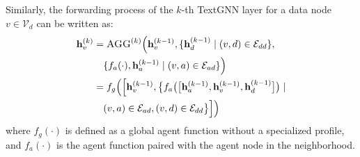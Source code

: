 Similarly, the forwarding process of the $k$-th TextGNN layer for a data node $v\in \mathcal{V}_d$ can be written as:
\begingroup
\small
\begin{equation}
\begin{aligned}
    \mathbf{h}_{v}^{(k)} & = \textsc{AGG}^{(k)}\Big( \mathbf{h}_v^{(k-1)}, \{\mathbf{h}_d^{(k-1)} \mid (v,d) \in \mathcal{E}_{dd}\}, \\
    &\quad \{f_a(\cdot), \mathbf{h}_a^{(k-1)} \mid (v,a) \in \mathcal{E}_{ad}\}\Big) \\
    &= f_g\Big(\Big[\mathbf{h}_v^{(k-1)}, \big\{f_a\big(\big[\mathbf{h}_a^{(k-1)}, \mathbf{h}_v^{(k-1)}, \mathbf{h}_d^{(k-1)}\big]\big) \mid \\
    &\quad (v,a) \in \mathcal{E}_{ad}, (v,d) \in \mathcal{E}_{dd}\big\}\Big]\Big)
\end{aligned}
\label{agg_data}
\end{equation}
\endgroup
where $f_g(\cdot)$ is defined as a global agent function without a specialized profile, and $f_a(\cdot)$ is the agent function paired with the agent node in the neighborhood.


